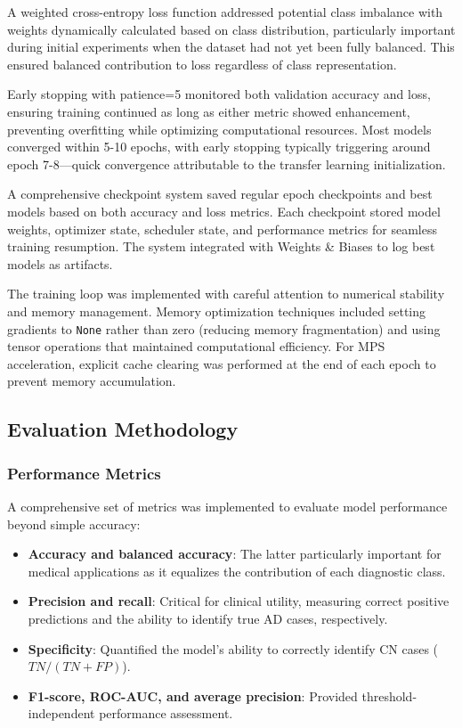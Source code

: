 \documentclass[12pt, a4paper]{article}
\begin{document}
A weighted cross-entropy loss function addressed potential class imbalance with weights dynamically calculated based on class distribution, particularly important during initial experiments when the dataset had not yet been fully balanced. This ensured balanced contribution to loss regardless of class representation.


Early stopping with patience=5 monitored both validation accuracy and loss, ensuring training continued as long as either metric showed enhancement, preventing overfitting while optimizing computational resources. Most models converged within 5-10 epochs, with early stopping typically triggering around epoch 7-8—quick convergence attributable to the transfer learning initialization.

A comprehensive checkpoint system saved regular epoch checkpoints and best models based on both accuracy and loss metrics. Each checkpoint stored model weights, optimizer state, scheduler state, and performance metrics for seamless training resumption. The system integrated with Weights \& Biases to log best models as artifacts.

The training loop was implemented with careful attention to numerical stability and memory management. Memory optimization techniques included setting gradients to \texttt{None} rather than zero (reducing memory fragmentation) and using tensor operations that maintained computational efficiency. For MPS acceleration, explicit cache clearing was performed at the end of each epoch to prevent memory accumulation.

\subsection{Evaluation Methodology}

\subsubsection{Performance Metrics}

A comprehensive set of metrics was implemented to evaluate model performance beyond simple accuracy:

\begin{itemize}
    \item \textbf{Accuracy and balanced accuracy}: The latter particularly important for medical applications as it equalizes the contribution of each diagnostic class.
    
    \item \textbf{Precision and recall}: Critical for clinical utility, measuring correct positive predictions and the ability to identify true AD cases, respectively.
    
    \item \textbf{Specificity}: Quantified the model's ability to correctly identify CN cases ($TN/(TN+FP)$).
    
    \item \textbf{F1-score, ROC-AUC, and average precision}: Provided threshold-independent performance assessment.
\end{itemize}
\end{document}
